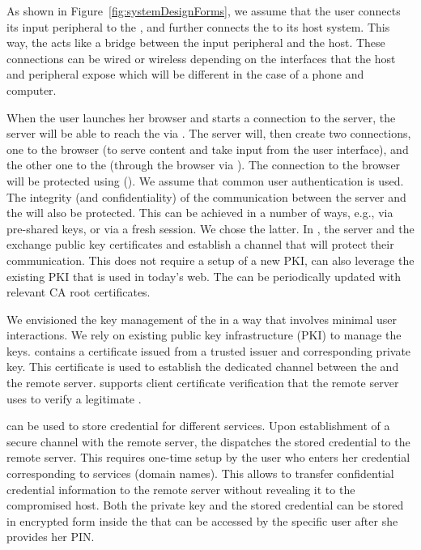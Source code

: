 As shown in Figure~\ref{fig:systemDesignForms}, we assume that the user connects its input peripheral to the \device, and further connects the \device to its host system. This way, the \device acts like a bridge between the input peripheral and the host. These connections can be wired or wireless depending on the interfaces that the host and peripheral expose which will be different in the case of a phone and computer. 

When the user launches her browser and starts a connection to the server, the server will be able to reach the \device via \webusb. The server will, then create two connections, one to the browser (to serve content and take input from the user interface), and the other one to the \device (through the browser via \webusb). The connection to the browser will be protected using \https (\tls). We assume that common user authentication is used. The integrity (and confidentiality) of the communication between the server and the \device will also be protected. This can be achieved in a number of ways, e.g., via pre-shared keys, or via a fresh \tls session. We chose the latter. In \name, the server and the \device exchange public key certificates and establish a \tls channel that will protect their communication. This does not require a setup of a new PKI, \name can also leverage the existing PKI that is used in today's web. The \device can be periodically updated with relevant CA root certificates. 


 We envisioned the key management of the \device in a way that involves minimal user interactions. We rely on existing public key infrastructure (PKI) to manage the keys. \device contains a certificate issued from a trusted issuer and corresponding private key. This certificate is used to establish the dedicated \tls channel between the \device and the remote server. \tls supports client certificate verification that the remote server uses to verify a legitimate \device. 

 \device can be used to store credential for different services. Upon establishment of a secure channel with the remote server, the \device dispatches the stored credential to the remote server. This requires one-time setup by the user who enters her credential corresponding to services (domain names). This allows \tool to transfer confidential credential information to the remote server without revealing it to the compromised host. Both the private key and the stored credential can be stored in encrypted form inside the \device that can be accessed by the specific user after she provides her PIN.

